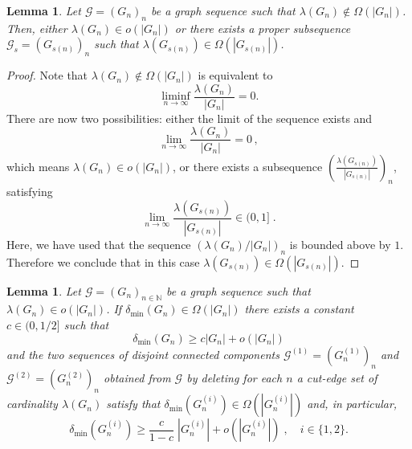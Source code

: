 \documentclass[a4paper,onecolumn,accepted=2024-12-14]{quantumarticle}
\newtheorem{lemma}[theorem]{Lemma}
\theoremstyle{plain}
\newcommand{\cG}{{\mathcal G}}         %
\newcommand{\N}{\mathbb{N}} %
\begin{document}
\begin{lemma}\label{lemma1degAGME}
Let $\cG=(G_n)_n$ be a graph sequence such that $\lambda(G_n)\not\in\Omega(|G_n|)$. Then, either $\lambda(G_n)\in o(|G_n|)$ or there exists a proper subsequence
$\cG_s=(G_{s(n)})_n$ such that $\lambda(G_{s(n)})\in\Omega(|G_{s(n)}|)$.
\end{lemma}
\begin{proof}
Note that $\lambda(G_n)\not\in\Omega(|G_n|)$ is equivalent to
\begin{equation}
\liminf_{n\to\infty}\frac{\lambda(G_n)}{|G_n|}=0.
\end{equation}
There are now two possibilities: either the limit of the sequence exists and
\begin{equation}
\lim_{n\to\infty}\frac{\lambda(G_n)}{|G_n|}=0\,,
\end{equation}
which means $\lambda(G_n)\in o(|G_n|)$, or there exists a subsequence
$\left(\frac{\lambda(G_{s(n)})}{|G_{s(n)}|}\right)_n$, satisfying
\begin{equation}
 \lim_{n\to\infty}\frac{\lambda(G_{s(n)})}{|G_{s(n)}|}\in (0,1]\;.
\end{equation}
Here, we have used that the sequence $(\lambda(G_n)/|G_n|)_n$ is bounded above by $1$.
Therefore we conclude that in this case
$\lambda(G_{s(n)})\in\Omega(|G_{s(n)}|)$.
\end{proof}


\begin{lemma}\label{lemma2degAGME}
 Let $\cG=(G_n)_{n\in\N}$ be a graph sequence such that
 $\lambda(G_n)\in o(|G_n|)$. If $\delta_{\mathrm{min}}\left({G}_n\right)\in\Omega(|G_n|)$ there exists a constant $c\in (0,1/2]$ such that
 \begin{equation}
 \delta_{\mathrm{min}}\left({G}_n\right)\geq c\left|{G}_n\right|
  +o\left(\left|{G}_n\right|\right)
  \end{equation}
and the two sequences of disjoint connected components
$\cG^{(1)}=\left(G_n^{(1)}\right)_n$ and $\cG^{(2)}=\left(G_n^{(2)}\right)_n$
obtained from $\cG$ by deleting for each $n$ a cut-edge set of cardinality
$\lambda(G_n)$ satisfy that $\delta_{\mathrm{min}}\left({G}_n^{(i)}\right)\in\Omega(|G_n^{(i)}|)$ and, in particular,
\begin{equation}
  \delta_{\mathrm{min}}\left({G}^{(i)}_n\right)\geq\frac{c}{1-c}\;\left|{G}^{(i)}_n\right|
  +o\left(\left|{G}^{(i)}_n\right|\right)\;,\quad i\in\{1,2\}.
\end{equation}
\end{lemma}
\end{document}
